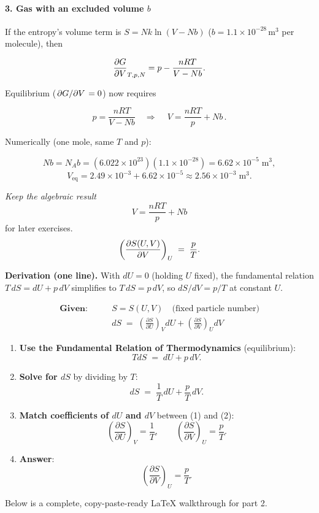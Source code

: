 \documentclass[12pt]{article}
\theoremstyle{definition} %
\theoremstyle{plain} %
\begin{document}
\paragraph{3.  Gas with an excluded volume $b$}

If the entropy’s volume term is \(S = Nk\ln(V - Nb)\) 
(\(b = 1.1\times10^{-28}\,\text{m}^{3}\) per molecule), then

\[
  \pdv{G}{V}_{T,p,N}
  = p - \frac{nRT}{V - Nb}.
\]

Equilibrium (\(\pdv*{G}{V}=0\)) now requires

\[
  p = \frac{nRT}{V - Nb}
  \quad\Longrightarrow\quad
  \boxed{\,V = \frac{nRT}{p} + N b\,}.
\]

Numerically (one mole, same $T$ and $p$):

\[
  N b = N_A b = (6.022\times10^{23})(1.1\times10^{-28})
       = 6.62\times10^{-5}\;\text{m}^{3},
\]
\[
  V_{\text{eq}}
  = 2.49\times10^{-3} + 6.62\times10^{-5}
  \approx \boxed{2.56\times10^{-3}\;\text{m}^{3}}.
\]

\medskip
\noindent
\textit{Keep the algebraic result}
\[
  V = \frac{nRT}{p} + N b
\]
for later exercises.
\[
  \left( \pdv{S(U,V)}{V} \right)_{U}
  \;=\;
  \frac{p}{T}.
\]

\textbf{Derivation (one line).}\;
With $dU=0$ (holding $U$ fixed), the fundamental relation
$T\,dS = dU + p\,dV$ simplifies to
$T\,dS = p\,dV$, so $dS/dV = p/T$ at constant $U$.

\begin{align*}
  \textbf{Given:}\qquad 
  & S=S(U,V)\quad\text{(fixed particle number)} \\[4pt]
  &\displaystyle dS \;=\;
    \left(\frac{\partial S}{\partial U}\right)_{V}\! dU
    +\left(\frac{\partial S}{\partial V}\right)_{U}\! dV
    \tag{1}
  \end{align*}
  
  \begin{enumerate}
  \item \textbf{Use the Fundamental Relation of Thermodynamics} (equilibrium):
    \[
      TdS \;=\; dU + p\,dV .
    \]
  
  \item \textbf{Solve for \(dS\)} by dividing by \(T\):
    \[
      dS \;=\; \frac{1}{T}\,dU + \frac{p}{T}\,dV .
      \tag{2}
    \]
  
  \item \textbf{Match coefficients of \(dU\) and \(dV\)} between (1) and (2):
    \[
      \left(\frac{\partial S}{\partial U}\right)_{V} = \frac{1}{T},
      \qquad
      \left(\frac{\partial S}{\partial V}\right)_{U} = \frac{p}{T}.
    \]
  
  \item \textbf{Answer}:
    \[
      \boxed{\displaystyle\left(\frac{\partial S}{\partial V}\right)_{U} = \frac{p}{T}}.
    \]
  \end{enumerate}
  Below is a complete, copy-paste-ready LaTeX walkthrough for part 2.
\end{document}
